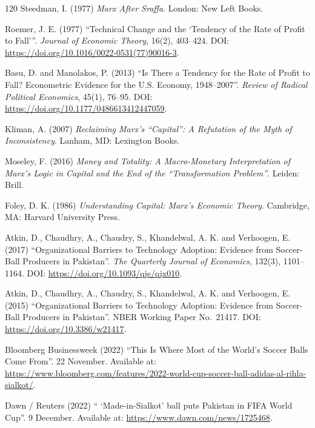 \begin{singlespace}
\begin{thebibliography}{120}
Steedman, I. (1977) \emph{Marx After Sraffa}.
London: New Left Books.

Roemer, J. E. (1977)
\enquote{Technical Change and the \enquote{Tendency of the Rate of Profit to Fall}}.
\emph{Journal of Economic Theory}, 16(2), 403--424.
DOI: \url{https://doi.org/10.1016/0022-0531(77)90016-3}.

Basu, D. and Manolakos, P. (2013)
``Is There a Tendency for the Rate of Profit to Fall? Econometric Evidence
for the U.S. Economy, 1948--2007''.
\emph{Review of Radical Political Economics}, 45(1), 76--95.
DOI: \url{https://doi.org/10.1177/0486613412447059}.

Kliman, A. (2007) \emph{Reclaiming Marx's \enquote{Capital}: A Refutation of the Myth of Inconsistency}.
Lanham, MD: Lexington Books.

Moseley, F. (2016) \emph{Money and Totality: A Macro-Monetary Interpretation of Marx's Logic in \emph{Capital} and the End of the \enquote{Transformation Problem}}.
Leiden: Brill.

Foley, D. K. (1986) \emph{Understanding Capital: Marx's Economic Theory}.
Cambridge, MA: Harvard University Press.


Atkin, D., Chaudhry, A., Chaudry, S., Khandelwal, A. K. and Verhoogen, E. (2017)
``Organizational Barriers to Technology Adoption: Evidence from Soccer-Ball Producers in Pakistan''.
\emph{The Quarterly Journal of Economics}, 132(3), 1101--1164.
DOI: \url{https://doi.org/10.1093/qje/qjx010}.

Atkin, D., Chaudhry, A., Chaudry, S., Khandelwal, A. K. and Verhoogen, E. (2015)
``Organizational Barriers to Technology Adoption: Evidence from Soccer-Ball Producers in Pakistan''.
NBER Working Paper No.\ 21417.
DOI: \url{https://doi.org/10.3386/w21417}.

Bloomberg Businessweek (2022)
``This Is Where Most of the World's Soccer Balls Come From''.
22 November.
Available at: \url{https://www.bloomberg.com/features/2022-world-cup-soccer-ball-adidas-al-rihla-sialkot/}.

Dawn / Reuters (2022)
`` `Made-in-Sialkot' ball puts Pakistan in FIFA World Cup''.
9 December.
Available at: \url{https://www.dawn.com/news/1725468}.


\end{thebibliography}
\end{singlespace}
